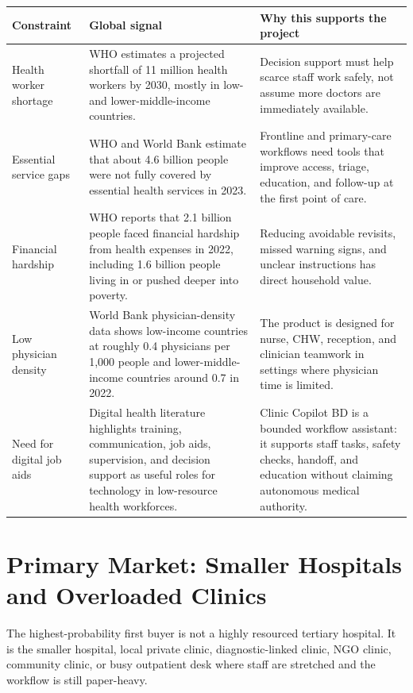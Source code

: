 \documentclass[11pt,letterpaper]{article}
\begin{document}
\begin{table}[H]
\centering
\begin{tabularx}{\linewidth}{@{}L{1.9in}L{1.85in}Y@{}}
\toprule
\textbf{Constraint} & \textbf{Global signal} & \textbf{Why this supports the project} \\
\midrule
Health worker shortage & WHO estimates a projected shortfall of 11 million health workers by 2030, mostly in low- and lower-middle-income countries. & Decision support must help scarce staff work safely, not assume more doctors are immediately available. \\
Essential service gaps & WHO and World Bank estimate that about 4.6 billion people were not fully covered by essential health services in 2023. & Frontline and primary-care workflows need tools that improve access, triage, education, and follow-up at the first point of care. \\
Financial hardship & WHO reports that 2.1 billion people faced financial hardship from health expenses in 2022, including 1.6 billion people living in or pushed deeper into poverty. & Reducing avoidable revisits, missed warning signs, and unclear instructions has direct household value. \\
Low physician density & World Bank physician-density data shows low-income countries at roughly 0.4 physicians per 1,000 people and lower-middle-income countries around 0.7 in 2022. & The product is designed for nurse, CHW, reception, and clinician teamwork in settings where physician time is limited. \\
Need for digital job aids & Digital health literature highlights training, communication, job aids, supervision, and decision support as useful roles for technology in low-resource health workforces. & Clinic Copilot BD is a bounded workflow assistant: it supports staff tasks, safety checks, handoff, and education without claiming autonomous medical authority. \\
\bottomrule
\end{tabularx}
\end{table}

\section{Primary Market: Smaller Hospitals and Overloaded Clinics}

The highest-probability first buyer is not a highly resourced tertiary hospital. It is the smaller hospital, local private clinic, diagnostic-linked clinic, NGO clinic, community clinic, or busy outpatient desk where staff are stretched and the workflow is still paper-heavy.
\end{document}
